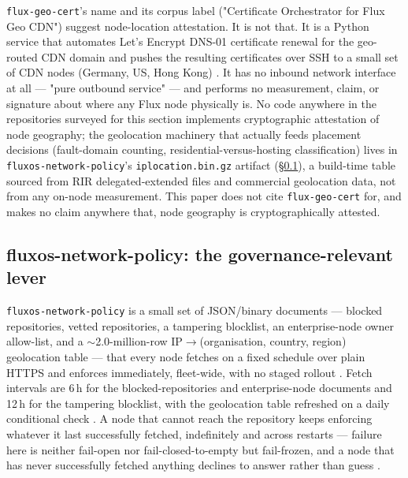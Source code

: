\texttt{flux-geo-cert}'s name and its corpus label ("Certificate Orchestrator for Flux Geo CDN")
suggest node-location attestation. It is not that. It is a Python service that automates Let's
Encrypt DNS-01 certificate renewal for the geo-routed CDN domain and pushes the resulting
certificates over SSH to a small set of CDN nodes (Germany, US, Hong Kong)
. It has no inbound network
interface at all — "pure outbound service"  — and
performs no measurement, claim, or signature about where any Flux node physically is. No code
anywhere in the repositories surveyed for this section implements cryptographic attestation of
node geography; the geolocation machinery that actually feeds placement decisions
(fault-domain counting, residential-versus-hosting classification) lives in
\texttt{fluxos-\allowbreak{}network-\allowbreak{}policy}'s \texttt{iplocation.\allowbreak{}bin.\allowbreak{}gz} artifact
(\S\ref{sec:networking-policy}), a build-time table sourced from RIR delegated-extended files and
commercial geolocation data, not from any on-node measurement. This paper does not cite
\texttt{flux-geo-cert} for, and makes no claim anywhere that, node geography is cryptographically
attested.

\subsection{fluxos-network-policy: the governance-relevant lever}
\label{sec:networking-policy}

\texttt{fluxos-\allowbreak{}network-\allowbreak{}policy} is a small set of JSON/binary documents — blocked repositories,
vetted repositories, a tampering blocklist, an enterprise-node owner allow-list, and a
$\sim$2.0-million-row IP$\to$(organisation, country, region) geolocation table — that every
\FluxOS node fetches on a fixed schedule over plain HTTPS and enforces immediately, fleet-wide,
with no staged rollout . Fetch intervals
are 6\,h for the blocked-repositories and enterprise-node documents and 12\,h for the tampering
blocklist, with the geolocation table refreshed on a daily conditional check
. A node that cannot reach the repository keeps
enforcing whatever it last successfully fetched, indefinitely and across restarts — failure here
is neither fail-open nor fail-closed-to-empty but fail-frozen, and a node that has never
successfully fetched anything declines to answer rather than guess
. \shipped

